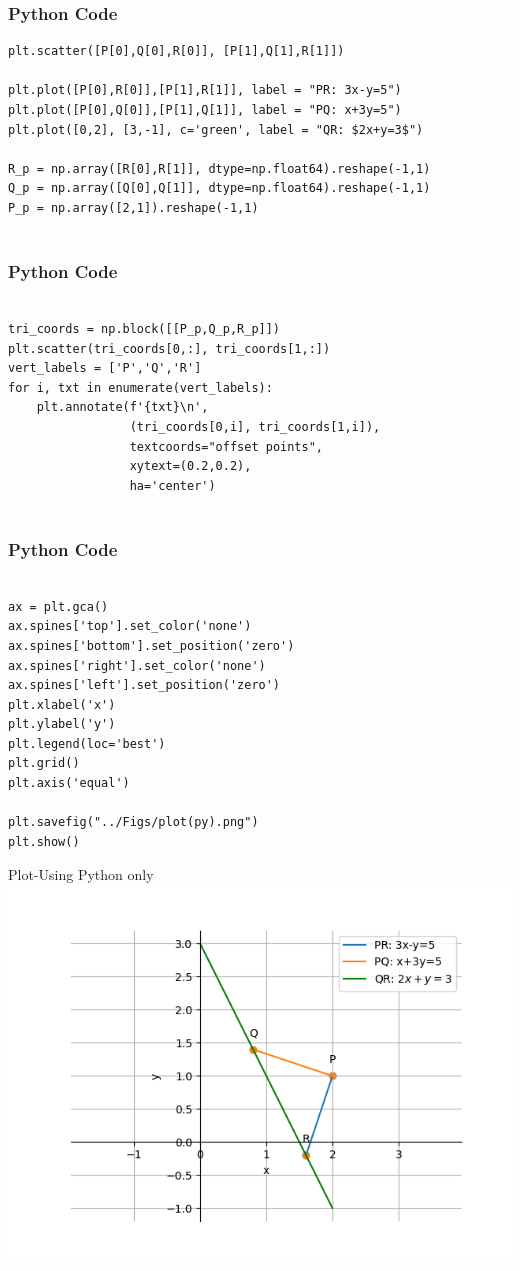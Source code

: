 \documentclass{beamer}
\begin{document}
\begin{frame}[fragile]
    \frametitle{Python Code}
    \begin{lstlisting}
plt.scatter([P[0],Q[0],R[0]], [P[1],Q[1],R[1]])

plt.plot([P[0],R[0]],[P[1],R[1]], label = "PR: 3x-y=5")
plt.plot([P[0],Q[0]],[P[1],Q[1]], label = "PQ: x+3y=5")
plt.plot([0,2], [3,-1], c='green', label = "QR: $2x+y=3$")

R_p = np.array([R[0],R[1]], dtype=np.float64).reshape(-1,1)
Q_p = np.array([Q[0],Q[1]], dtype=np.float64).reshape(-1,1)
P_p = np.array([2,1]).reshape(-1,1)


\end{lstlisting}
\end{frame}

\begin{frame}[fragile]
    \frametitle{Python Code}
    \begin{lstlisting}

tri_coords = np.block([[P_p,Q_p,R_p]])
plt.scatter(tri_coords[0,:], tri_coords[1,:])
vert_labels = ['P','Q','R']
for i, txt in enumerate(vert_labels):
    plt.annotate(f'{txt}\n',
                 (tri_coords[0,i], tri_coords[1,i]), 
                 textcoords="offset points", 
                 xytext=(0.2,0.2), 
                 ha='center') 


\end{lstlisting}
\end{frame}

\begin{frame}[fragile]
    \frametitle{Python Code}
    \begin{lstlisting}

ax = plt.gca()
ax.spines['top'].set_color('none')
ax.spines['bottom'].set_position('zero')
ax.spines['right'].set_color('none')
ax.spines['left'].set_position('zero')
plt.xlabel('x')
plt.ylabel('y')
plt.legend(loc='best')
plt.grid()
plt.axis('equal')

plt.savefig("../Figs/plot(py).png")
plt.show()

\end{lstlisting}
\end{frame}


\begin{frame}{Plot-Using Python only}
    \centering
    \includegraphics[width=\columnwidth, height=0.8\textheight, keepaspectratio]{Figs/plot(py).png}     
\end{frame}
\end{document}
